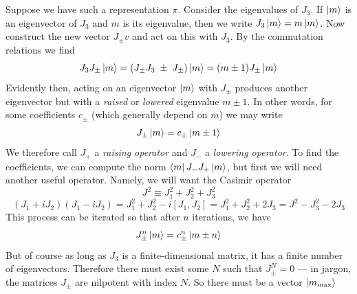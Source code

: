 \documentclass[onecolumn]{gwclass}
\renewcommand{\t}[1]{\text{#1}}
\begin{document}
Suppose we have such a representation $\pi$. Consider the eigenvalues of $J_3$. If $\ket{m}$ is an eigenvector of $J_3$ and $m$ is its eigenvalue, then we write $J_3\ket{m} = m \ket{m}$. Now construct the new vector $J_\pm v$ and act on this with $J_3$. By the commutation relations we find
$$ J_3 J_\pm \ket{m} = \left(J_\pm J_3 \; \pm\; J_\pm\right)\ket{m} = (m \pm 1)J_\pm \ket{m} $$
Evidently then, acting on an eigenvector $\ket{m}$ with $J_\pm$ produces another eigenvector but with a \emph{raised} or \emph{lowered} eigenvalue $m\pm 1$. In other words, for some coefficients $c_\pm$ (which generally depend on $m$) we may write
$$ J_\pm \ket{m} = c_\pm\ket{m\pm 1} $$
We therefore call $J_+$ a \emph{raising operator} and $J_-$ a \emph{lowering operator}. To find the coefficients, we can compute the norm $\bra{m}J_-J_+\ket{m}$, but first we will need another useful operator. Namely, we will want the Casimir operator
$$ J^2 \equiv J_1^2 + J_2^2 + J_3^2 $$
$$ (J_1 + iJ_2)(J_1 - iJ_2) = J_1^2 + J_2^2 - i[J_1,J_2] = J_1^2 + J_2^2 + 2J_3 = J^2 - J_3^2 - 2J_3 $$
This process can be iterated so that after $n$ iterations, we have
$$ J_\pm^n \ket{m} = c_\pm^n \ket{m\pm n} $$
But of course as long as $J_3$ is a finite-dimensional matrix, it has a finite number of eigenvectors. Therefore there must exist some $N$ such that $J_\pm^N=0$ --- in jargon, the matrices $J_\pm$ are nilpotent with index $N$. So there must be a vector $\ket{m_\t{max}}$ 	
\end{document}
